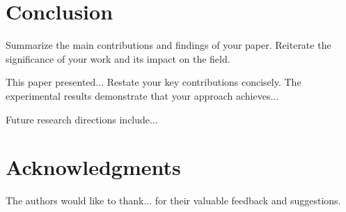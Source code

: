 \section{Conclusion}
\label{sec:conclusion}

Summarize the main contributions and findings of your paper. Reiterate the significance of your work and its impact on the field.

This paper presented... Restate your key contributions concisely. The experimental results demonstrate that your approach achieves...

Future research directions include...

\section*{Acknowledgments}
The authors would like to thank... for their valuable feedback and suggestions.

